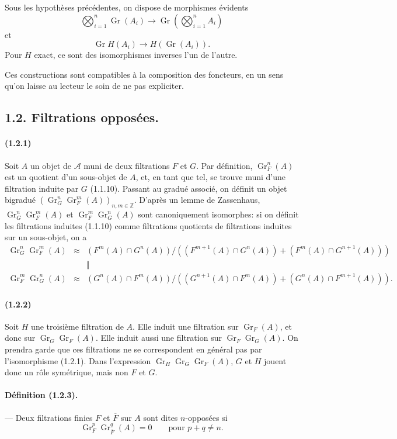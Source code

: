 \documentclass[10pt]{article}
\newcommand{\Z}{\mathbb Z}
\newcommand{\Gr}{\operatorname{Gr}}
\newcommand{\calA}{\mathcal A}
\begin{document}
Sous les hypothèses précédentes, on dispose de morphismes évidents
\[
\bigotimes_{i=1}^n\Gr(A_i)\to \Gr\left(\bigotimes_{i=1}^nA_i\right)
\]
et
\[
\Gr H(A_i)\to H(\Gr(A_i)).
\]
Pour $H$ exact, ce sont des isomorphismes inverses l'un de l'autre.

Ces constructions sont compatibles à la composition des foncteurs, en un sens qu'on laisse au lecteur le soin de ne pas expliciter.

\subsection*{1.2. Filtrations opposées.}

\paragraph{(1.2.1)} Soit $A$ un objet de $\calA$ muni de deux filtrations $F$ et $G$. Par définition, $\Gr_F^n(A)$ est un quotient d'un sous-objet de $A$, et, en tant que tel, se trouve muni d'une filtration induite par $G$ (1.1.10). Passant au gradué associé, on définit un objet bigradué $(\Gr_G^n\Gr_F^m(A))_{n,m\in\Z}$. D'après un lemme de Zassenhaus, $\Gr_G^n\Gr_F^m(A)$ et $\Gr_F^m\Gr_G^n(A)$ sont canoniquement isomorphes: si on définit les filtrations induites (1.1.10) comme filtrations quotients de filtrations induites sur un sous-objet, on a
\[
\begin{array}{rcc}
\Gr_G^n\Gr_F^m(A)&\approx&
(F^m(A)\cap G^n(A))/((F^{m+1}(A)\cap G^n(A))+(F^m(A)\cap G^{n+1}(A)))\\
&&\Big\Vert\\
\Gr_F^m\Gr_G^n(A)&\approx&
(G^n(A)\cap F^m(A))/((G^{n+1}(A)\cap F^m(A))+(G^n(A)\cap F^{m+1}(A))).
\end{array}
\]

\paragraph{(1.2.2)} Soit $H$ une troisième filtration de $A$. Elle induit une filtration sur $\Gr_F(A)$, et donc sur $\Gr_G\Gr_F(A)$. Elle induit aussi une filtration sur $\Gr_F\Gr_G(A)$. On prendra garde que ces filtrations ne se correspondent en général pas par l'isomorphisme (1.2.1). Dans l'expression $\Gr_H\Gr_G\Gr_F(A)$, $G$ et $H$ jouent donc un rôle symétrique, mais non $F$ et $G$.

\paragraph{Définition (1.2.3).} --- Deux filtrations finies $F$ et $\overline F$ sur $A$ sont dites $n$-opposées si
\[
\Gr_F^p\Gr_{\overline F}^{q}(A)=0\qquad\text{pour }p+q\ne n.
\]
\end{document}
